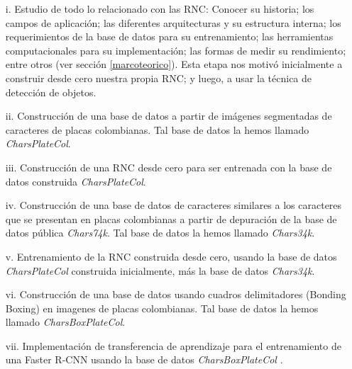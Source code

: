 \begin{itemize}

\item[i.] Estudio de todo lo relacionado con las RNC: Conocer su historia; los campos de aplicación; las diferentes arquitecturas y su estructura interna; los requerimientos de la base de datos para su entrenamiento; las herramientas computacionales para su implementación; las formas de medir su rendimiento; entre otros (ver sección \ref{marcoteorico}). Esta etapa nos motivó inicialmente a construir desde cero nuestra propia RNC; y luego, a usar la técnica de detección de objetos. 
    
\item[ii.] Construcción de una base de datos a partir de imágenes segmentadas de caracteres de placas colombianas. Tal base de datos la hemos llamado \textit{CharsPlateCol}. 
    
\item[iii.] Construcción de una RNC desde cero para ser entrenada con la base de datos construida \textit{CharsPlateCol}.
    
\item[iv.] Construcción de una base de datos de caracteres similares a los caracteres que se presentan en placas colombianas a partir de depuración de la base de datos pública \textit{Chars74k}. Tal base de datos la hemos llamado \textit{Chars34k}. 
    
\item[v.] Entrenamiento de la RNC construida desde cero, usando la base de datos \textit{CharsPlateCol} construida inicialmente, más la base de datos \textit{Chars34k}.
    
\item[vi.] Construcción de una base de datos usando cuadros delimitadores (Bonding Boxing) en imagenes de placas colombianas. Tal base de datos la hemos llamado \textit{CharsBoxPlateCol}.
 
 \item[vii.] Implementación de transferencia de aprendizaje para el entrenamiento de una Faster R-CNN usando la base de datos \textit{CharsBoxPlateCol} .
    \end{itemize}

    
